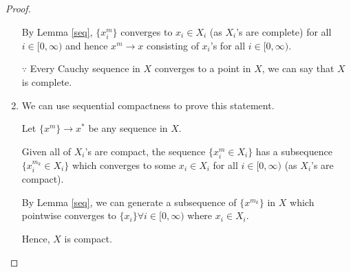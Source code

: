 \documentclass[12pt]{article}
\begin{document}
\begin{proof}
\begin{enumerate}
{            By Lemma \ref{seq}, $\{x^m_i\}$ converges to $x_i \in X_i$ (as $X_i$'s are complete) for all $i \in [0, \infty)$ and hence $x^m \to x$ consisting of $x_i$'s for all $i \in [0, \infty)$.

            $\because$ Every Cauchy sequence in $X$ converges to a point in $X$, we can say that $X$ is complete.
        }
        \vspace{0.2cm}
        \item {
            We can use sequential compactness to prove this statement.
            
            Let $\{x^m\} \to x^*$ be any sequence in $X$. 
            
            Given all of $X_i$'s are compact, the sequence $\{x^m_i \in X_i\}$ has a subsequence $\{x^{m_k}_i \in X_i\}$ which converges to some $x_i \in X_i$ for all $i \in [0, \infty)$ (as $X_i$'s are compact).

            By Lemma \ref{seq}, we can generate a subsequence of $\{x^{m_k}\}$ in $X$ which pointwise converges to $\{x_i\} \forall i \in [0, \infty)$ where $x_i \in X_i$.
            
            Hence, $X$ is compact.
        }
    \end{enumerate}
\end{proof}
\end{document}

